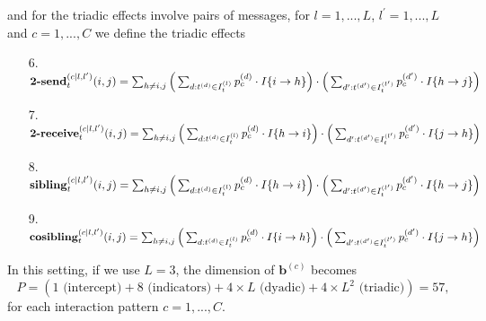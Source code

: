 \documentclass[a4paper]{article}
\begin{document}
and for the triadic effects involve pairs of messages, for $l = 1,...,L$, $l^\prime=1,...,L$ and $c=1,...,C$ we define the triadic effects
\begin{itemize}
	 	\item [6.] $\mbox{\textbf{2-send}}^{(c|l, l^\prime)}_t(i, j)=\sum_{h \neq i, j}\Big(\sum_{d: t^{(d)} \in I_t^{(l)}}p_c^{(d)}\cdot I\{i\rightarrow h\}\Big)\cdot \Big(\sum_{d': t^{(d')} \in I_t^{(l^\prime)}}p_c^{(d')}\cdot I\{h\rightarrow j\}\Big)$
 	\item [7.] $\mbox{\textbf{2-receive}}^{(c|l, l^\prime)}_t(i, j)=\sum_{h \neq i, j}\Big(\sum_{d: t^{(d)} \in I_t^{(l)}}p_c^{(d)}\cdot I\{h\rightarrow i\}\Big)\cdot \Big(\sum_{d': t^{(d')} \in I_t^{(l^\prime)}}p_c^{(d')}\cdot I\{j\rightarrow h\}\Big)$
 	\item [8.] $\mbox{\textbf{sibling}}^{(c|l, l^\prime)}_t(i, j)=\sum_{h \neq i, j}\Big(\sum_{d: t^{(d)} \in I_t^{(l)}}p_c^{(d)}\cdot I\{h\rightarrow i\}\Big)\cdot \Big(\sum_{d': t^{(d')} \in I_t^{(l^\prime)}}p_c^{(d')}\cdot I\{h\rightarrow j\}\Big)$
 	\item [9.] $\mbox{\textbf{cosibling}}^{(c|l, l^\prime)}_t(i, j)=\sum_{h \neq i, j}\Big(\sum_{d: t^{(d)} \in I_t^{(l)}}p_c^{(d)}\cdot I\{i\rightarrow h\}\Big)\cdot \Big(\sum_{d': t^{(d')} \in I_t^{(l^\prime)}}p_c^{(d')}\cdot I\{j\rightarrow h\}\Big)$
 \end{itemize}
In this setting, if we use $L=3$, the dimension of $\boldsymbol{b}^{(c)}$ becomes $$P =  (1 \mbox{ (intercept)} + 8 \mbox{ (indicators)}+ 4 \times L \mbox{ (dyadic)} + 4 \times L^2 \mbox{ (triadic)}) = 57,$$
for each interaction pattern $c=1,...,C$.
\end{document}
